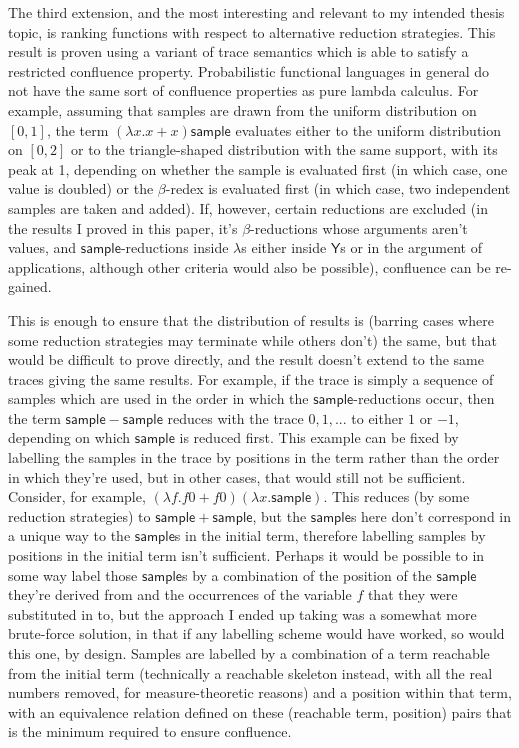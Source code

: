 \documentclass[titlepage]{article}
\newcommand{\tY}{\mathsf{Y}}
\newcommand{\tsample}{\mathsf{sample}}
\begin{document}
The third extension, and the most interesting and relevant to my intended thesis topic, is ranking functions with respect to alternative reduction strategies. This result is proven using a variant of trace semantics which is able to satisfy a restricted confluence property. Probabilistic functional languages in general do not have the same sort of confluence properties as pure lambda calculus. For example, assuming that samples are drawn from the uniform distribution on $[0,1]$, the term $(\lambda x. x + x) \tsample$ evaluates either to the uniform distribution on $[0,2]$ or to the triangle-shaped distribution with the same support, with its peak at 1, depending on whether the sample is evaluated first (in which case, one value is doubled) or the $\beta$-redex is evaluated first (in which case, two independent samples are taken and added). If, however, certain reductions are excluded (in the results I proved in this paper, it's $\beta$-reductions whose arguments aren't values, and $\tsample$-reductions inside $\lambda$s either inside $\tY$s or in the argument of applications, although other criteria would also be possible), confluence can be re-gained.

This is enough to ensure that the distribution of results is (barring cases where some reduction strategies may terminate while others don't) the same, but that would be difficult to prove directly, and the result doesn't extend to the same traces giving the same results. For example, if the trace is simply a sequence of samples which are used in the order in which the $\tsample$-reductions occur, then the term $\tsample - \tsample$ reduces with the trace $0, 1, ...$ to either $1$ or $-1$, depending on which $\tsample$ is reduced first. This example can be fixed by labelling the samples in the trace by positions in the term rather than the order in which they're used, but in other cases, that would still not be sufficient. Consider, for example, $(\lambda f. f 0 + f 0) (\lambda x. \tsample)$. This reduces (by some reduction strategies) to $\tsample + \tsample$, but the $\tsample$s here don't correspond in a unique way to the $\tsample$s in the initial term, therefore labelling samples by positions in the initial term isn't sufficient. Perhaps it would be possible to in some way label those $\tsample$s by a combination of the position of the $\tsample$ they're derived from and the occurrences of the variable $f$ that they were substituted in to, but the approach I ended up taking was a somewhat more brute-force solution, in that if any labelling scheme would have worked, so would this one, by design. Samples are labelled by a combination of a term reachable from the initial term (technically a reachable skeleton instead, with all the real numbers removed, for measure-theoretic reasons) and a position within that term, with an equivalence relation defined on these (reachable term, position) pairs that is the minimum required to ensure confluence.
\end{document}
